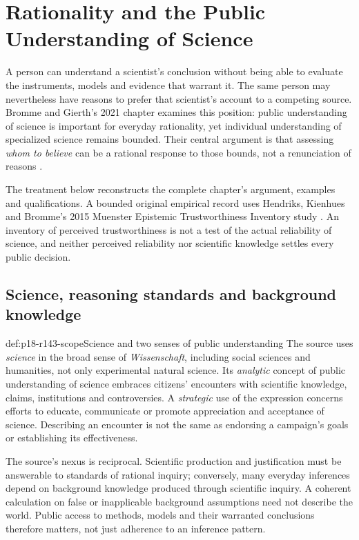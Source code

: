 \chapter{Rationality and the Public Understanding of Science}
\label{sec:p18-rationality-14-3}

A person can understand a scientist's conclusion without being able to
evaluate the instruments, models and evidence that warrant it. The same
person may nevertheless have reasons to prefer that scientist's account
to a competing source. Bromme and Gierth's 2021 chapter examines this
position: public understanding of science is important for everyday
rationality, yet individual understanding of specialized science remains
bounded. Their central argument is that assessing \emph{whom to believe}
can be a rational response to those bounds, not a renunciation of reasons
\cite{BrommeGierth2021PublicScience}.

The treatment below reconstructs the complete chapter's argument, examples
and qualifications. A bounded original empirical record uses Hendriks,
Kienhues and Bromme's 2015 Muenster Epistemic Trustworthiness Inventory
study \cite{HendriksKienhuesBromme2015METI}. An inventory of perceived
trustworthiness is not a test of the actual reliability of science, and
neither perceived reliability nor scientific knowledge settles every
public decision.

\section{Science, reasoning standards and background knowledge}
\label{sec:p18-r143-nexus}

\begin{hbdefinition}{def:p18-r143-scope}{Science and two senses of public understanding}
The source uses \emph{science} in the broad sense of \emph{Wissenschaft},
including social sciences and humanities, not only experimental natural
science. Its \emph{analytic} concept of public understanding of science
embraces citizens' encounters with scientific knowledge, claims, institutions
and controversies. A \emph{strategic} use of the expression concerns efforts
to educate, communicate or promote appreciation and acceptance of science.
Describing an encounter is not the same as endorsing a campaign's goals or
establishing its effectiveness.
\end{hbdefinition}

The source's nexus is reciprocal. Scientific production and justification
must be answerable to standards of rational inquiry; conversely, many
everyday inferences depend on background knowledge produced through
scientific inquiry. A coherent calculation on false or inapplicable
background assumptions need not describe the world. Public access to
methods, models and their warranted conclusions therefore matters, not
just adherence to an inference pattern.


